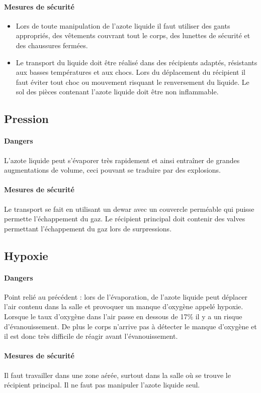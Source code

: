 \paragraph{Mesures de sécurité}

\begin{itemize}
  \item Lors de toute manipulation de l'azote liquide il faut utiliser des gants appropriés, des vêtements couvrant tout le corps, des lunettes de sécurité et des chaussures fermées.
  \item Le transport du liquide doit être réalisé dans des récipients adaptés, résistants aux basses températures et aux chocs. Lors du déplacement du récipient il faut éviter tout choc ou mouvement risquant le renversement du liquide. Le sol des pièces contenant l'azote liquide doit être non inflammable.
\end{itemize}

\subsection{Pression}

\paragraph{Dangers}

L'azote liquide peut s'évaporer très rapidement et ainsi entraîner de grandes augmentations de volume, ceci pouvant se traduire par des explosions.
\paragraph{Mesures de sécurité}

Le transport se fait en utilisant un dewar avec un couvercle perméable qui puisse permette l'échappement du gaz. Le récipient principal doit contenir des valves permettant l'échappement du gaz lors de surpressions.

\subsection{Hypoxie}

\paragraph{Dangers}

Point relié au précédent : lors de l'évaporation, de l'azote liquide peut déplacer l'air contenu dans la salle et provoquer un manque d'oxygène appelé hypoxie. Lorsque le taux d'oxygène dans l'air passe en dessous de 17\% il y a un risque d'évanouissement. De plus le corps n'arrive pas à détecter le manque d'oxygène et il est donc très difficile de réagir avant l'évanouissement.
\paragraph{Mesures de sécurité}

Il faut travailler dans une zone aérée, surtout dans la salle où se trouve le récipient principal. Il ne faut pas manipuler l'azote liquide seul.




